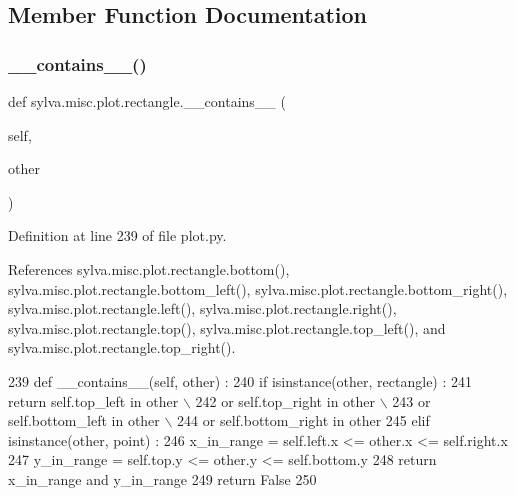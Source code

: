 \subsection{Member Function Documentation}
\mbox{\label{classsylva_1_1misc_1_1plot_1_1rectangle_a097b8412cf074afb98f7f88cd0e2f1bc}} 
\subsubsection{\texorpdfstring{\+\_\+\+\_\+contains\+\_\+\+\_\+()}{\_\_contains\_\_()}}
{\footnotesize\ttfamily def sylva.\+misc.\+plot.\+rectangle.\+\_\+\+\_\+contains\+\_\+\+\_\+ (\begin{DoxyParamCaption}\item[{}]{self,  }\item[{}]{other }\end{DoxyParamCaption})}



Definition at line 239 of file plot.\+py.



References sylva.\+misc.\+plot.\+rectangle.\+bottom(), sylva.\+misc.\+plot.\+rectangle.\+bottom\+\_\+left(), sylva.\+misc.\+plot.\+rectangle.\+bottom\+\_\+right(), sylva.\+misc.\+plot.\+rectangle.\+left(), sylva.\+misc.\+plot.\+rectangle.\+right(), sylva.\+misc.\+plot.\+rectangle.\+top(), sylva.\+misc.\+plot.\+rectangle.\+top\+\_\+left(), and sylva.\+misc.\+plot.\+rectangle.\+top\+\_\+right().


\begin{DoxyCode}
239     \textcolor{keyword}{def }\_\_contains\_\_(self, other) :
240       \textcolor{keywordflow}{if} isinstance(other, rectangle) :
241         \textcolor{keywordflow}{return} self.top\_left \textcolor{keywordflow}{in} other \(\backslash\)
242             \textcolor{keywordflow}{or} self.top\_right \textcolor{keywordflow}{in} other \(\backslash\)
243             \textcolor{keywordflow}{or} self.bottom\_left \textcolor{keywordflow}{in} other \(\backslash\)
244             \textcolor{keywordflow}{or} self.bottom\_right \textcolor{keywordflow}{in} other
245       \textcolor{keywordflow}{elif} isinstance(other, point) :
246         x\_in\_range = self.left.x <= other.x <= self.right.x
247         y\_in\_range = self.top.y <= other.y <= self.bottom.y
248         \textcolor{keywordflow}{return} x\_in\_range \textcolor{keywordflow}{and} y\_in\_range
249       \textcolor{keywordflow}{return} \textcolor{keyword}{False}
250 
\end{DoxyCode}
\mbox{\label{classsylva_1_1misc_1_1plot_1_1rectangle_a1ad220e20ea15beaeafdd814705d570e}} 
